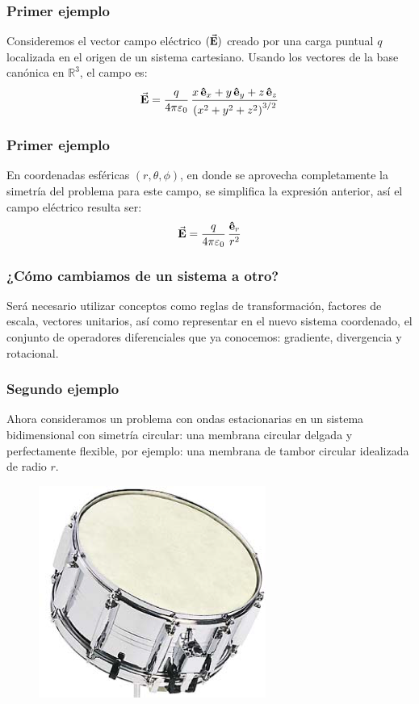 \documentclass[12pt]{beamer}
\begin{document}
\begin{frame}
\frametitle{Primer ejemplo}
Consideremos el vector campo eléctrico $(\va{E})$ creado por una carga puntual $q$ localizada en el origen de un sistema cartesiano. \pause Usando los vectores de la base canónica en $\mathbb{R}^{3}$, el campo es:
\pause
\begin{align*}
\va{E} = \dfrac{q}{4 \pi \varepsilon_{0}} \, \dfrac{x \, \vu{e}_{x} + y \, \vu{e}_{y} + z \, \vu{e}_{z}}{\left( x^{2} + y^{2} + z^{2} \right)^{3/2}}
\end{align*}
\end{frame}
\begin{frame}
\frametitle{Primer ejemplo}
En coordenadas esféricas $(r, \theta, \phi)$, en donde se aprovecha completamente la simetría del problema para este campo, se simplifica la expresión anterior, \pause así el campo eléctrico resulta ser:
\begin{align*}
\va{\vb{E}} = \dfrac{q}{4 \pi \varepsilon_{0}} \, \dfrac{\vu{e}_{r}}{r^{2}}
\end{align*}
\end{frame}
\begin{frame}
\frametitle{¿Cómo cambiamos de un sistema a otro?}
Será necesario utilizar conceptos como reglas de transformación, factores de escala, vectores unitarios, así como representar en el nuevo sistema coordenado, el conjunto de operadores diferenciales que ya conocemos: gradiente, divergencia y rotacional.
\end{frame}
\begin{frame}
\frametitle{Segundo ejemplo}
Ahora consideramos un problema con ondas estacionarias en un sistema bidimensional con simetría circular: una membrana circular delgada y perfectamente flexible, por ejemplo: una membrana de tambor circular idealizada de radio $r$.
\pause
\begin{figure}[H]
  \centering
  \includegraphics[scale=0.75]{Imagenes/Tambor.png}
\end{figure}
\end{frame}
\end{document}

